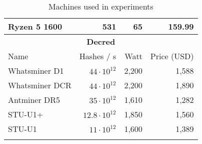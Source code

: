 \begin{longtable}{|p{}|r|r|r|}
  Ryzen 5 1600 & 531 & 65 & 159.99 \\
  \hline
  \multicolumn{4}{|c|}{\textbf{Decred}} \\
  \hline
  Name & Hashes / s & Watt & Price (USD) \\
  \hhline{|=|=|=|=|}
  Whatsminer D1 & $44 \cdot 10^{12}$ & 2,200 & 1,588 \\
  Whatsminer DCR & $44 \cdot 10^{12}$ & 2,200 & 1,890 \\
  Antminer DR5 & $35 \cdot 10^{12}$ & 1,610 & 1,282 \\
  STU-U1+ & $12.8 \cdot 10^{12}$ & 1,850 & 1,560 \\
  STU-U1 & $11 \cdot 10^{12}$ & 1,600 & 1,389 \\
  \hline
\caption{Machines used in experiments}
\label{tbl:machines}
\end{longtable}
